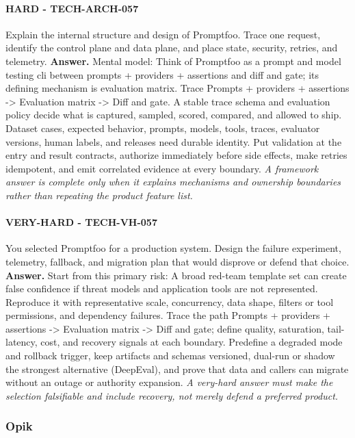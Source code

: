 \paragraph{HARD - TECH-ARCH-057} Explain the internal structure and design of Promptfoo. Trace one request, identify the control plane and data plane, and place state, security, retries, and telemetry.
\textbf{Answer.} Mental model: Think of Promptfoo as a prompt and model testing cli between prompts + providers + assertions and diff and gate; its defining mechanism is evaluation matrix. Trace Prompts + providers + assertions -> Evaluation matrix -> Diff and gate. A stable trace schema and evaluation policy decide what is captured, sampled, scored, compared, and allowed to ship. Dataset cases, expected behavior, prompts, models, tools, traces, evaluator versions, human labels, and releases need durable identity. Put validation at the entry and result contracts, authorize immediately before side effects, make retries idempotent, and emit correlated evidence at every boundary.
\textit{A framework answer is complete only when it explains mechanisms and ownership boundaries rather than repeating the product feature list.}
\paragraph{VERY-HARD - TECH-VH-057} You selected Promptfoo for a production system. Design the failure experiment, telemetry, fallback, and migration plan that would disprove or defend that choice.
\textbf{Answer.} Start from this primary risk: A broad red-team template set can create false confidence if threat models and application tools are not represented. Reproduce it with representative scale, concurrency, data shape, filters or tool permissions, and dependency failures. Trace the path Prompts + providers + assertions -> Evaluation matrix -> Diff and gate; define quality, saturation, tail-latency, cost, and recovery signals at each boundary. Predefine a degraded mode and rollback trigger, keep artifacts and schemas versioned, dual-run or shadow the strongest alternative (DeepEval), and prove that data and callers can migrate without an outage or authority expansion.
\textit{A very-hard answer must make the selection falsifiable and include recovery, not merely defend a preferred product.}
\subsubsection*{Opik}
